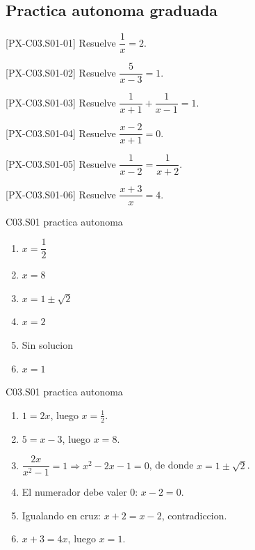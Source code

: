 \subsection*{Practica autonoma graduada}
\begin{exercise}{[PX-C03.S01-01] Resuelve \(\dfrac{1}{x}=2\).}
\end{exercise}
\begin{exercise}{[PX-C03.S01-02] Resuelve \(\dfrac{5}{x-3}=1\).}
\end{exercise}
\begin{exercise}{[PX-C03.S01-03] Resuelve \(\dfrac{1}{x+1}+\dfrac{1}{x-1}=1\).}
\end{exercise}
\begin{exercise}{[PX-C03.S01-04] Resuelve \(\dfrac{x-2}{x+1}=0\).}
\end{exercise}
\begin{exercise}{[PX-C03.S01-05] Resuelve \(\dfrac{1}{x-2}=\dfrac{1}{x+2}\).}
\end{exercise}
\begin{exercise}{[PX-C03.S01-06] Resuelve \(\dfrac{x+3}{x}=4\).}
\end{exercise}

\begin{shortanswer}{C03.S01 practica autonoma}
\begin{enumerate}[label=\textbf{PX-C03.S01-\arabic*:}, leftmargin=*]
  \item \(x=\dfrac{1}{2}\)
  \item \(x=8\)
  \item \(x=1\pm \sqrt{2}\)
  \item \(x=2\)
  \item Sin solucion
  \item \(x=1\)
\end{enumerate}
\end{shortanswer}

\begin{fullsolution}{C03.S01 practica autonoma}
\begin{enumerate}[label=\textbf{PX-C03.S01-\arabic*:}, leftmargin=*]
  \item \(1=2x\), luego \(x=\tfrac{1}{2}\).
  \item \(5=x-3\), luego \(x=8\).
  \item \(\dfrac{2x}{x^2-1}=1 \Longrightarrow x^2-2x-1=0\), de donde \(x=1\pm \sqrt{2}\).
  \item El numerador debe valer \(0\): \(x-2=0\).
  \item Igualando en cruz: \(x+2=x-2\), contradiccion.
  \item \(x+3=4x\), luego \(x=1\).
\end{enumerate}
\end{fullsolution}

